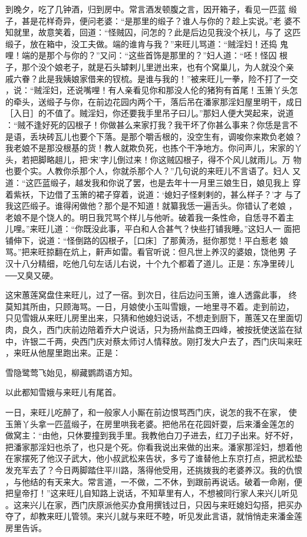到晚夕，吃了几钟酒，归到房中。常言酒发顿腹之言，因开箱子，看见一匹蓝
缎子，甚是花样奇异，便问老婆：“是那里的缎子？谁人与你的？趁上实说。”老
婆不知就里，故意笑着，回道：“怪贼囚，问怎的？此是后边见我没个袄儿，与了
这匹缎子，放在箱中，没工夫做。端的谁肯与我？”来旺儿骂道：“贼淫妇！还捣
鬼哩！端的是那个与你的？”又问：“这些首饰是那里的？”妇人道：“呸！怪囚
根子，那个没个娘老子，就是石头罅剌儿里迸出来，也有个窝巢儿，为人就没个亲
戚六眷？此是我姨娘家借来的钗梳。是谁与我的！”被来旺儿一拳，险不打了一交
，说：“贼淫妇，还说嘴哩！有人亲看见你和那没人伦的猪狗有首尾！玉箫丫头怎
的牵头，送缎子与你，在前边花园内两个干，落后吊在潘家那淫妇屋里明干，成日
［入日］的不值了。贼淫妇，你还要我手里吊子曰儿。”那妇人便大哭起来，说道
：“贼不逢好死的囚根子！你做甚么来家打我？我干坏了你甚么事来？你恁是言不
是语，丢块砖瓦儿也要个下落。是那个嚼舌根的，没空生有，调唆你来欺负老娘？
我老娘不是那没根基的货！教人就欺负死，也拣个干净地方。你问声儿，宋家的丫
头，若把脚略趄儿，把‘宋’字儿倒过来！你这贼囚根子，得不个风儿就雨儿。万
物也要个实。人教你杀那个人，你就杀那个人？”几句说的来旺儿不言语了。妇人
又道：“这匹蓝缎子，越发我和你说了罢，也是去年十一月里三娘生日，娘见我上
穿着紫袄，下边借了玉箫的裙子穿着，说道：‘媳妇子怪剌剌的，甚么样子？’才
与了我这匹缎子。谁得闲做他？那个是不知道！就纂我恁一遍舌头。你错认了老娘
，老娘不是个饶人的。明日我咒骂个样儿与他听。破着我一条性命，自恁寻不着主
儿哩。”来旺儿道：“你既没此事，平白和人合甚气？快些打铺我睡。”这妇人一
面把铺伸下，说道：“怪倒路的囚根子，［口床］了那黄汤，挺你那觉！平白惹老
娘骂。”把来旺掠翻在炕上，鼾声如雷。看官听说：但凡世上养汉的婆娘，饶他男
子汉十八分精细，吃他几句左话儿右说，十个九个都着了道儿。正是：东净里砖儿
──又臭又硬。

这宋蕙莲窝盘住来旺儿，过了一宿。到次日，往后边问玉箫，谁人透露此事，
终莫知其所由，只顾海骂。一日，月娘使小玉叫雪娥，一地里寻不着。走到前边，
只见雪娥从来旺儿房里出来，只猜和他媳妇说话，不想走到厨下，蕙莲又在里面切
肉，良久，西门庆前边陪着乔大户说话，只为扬州盐商王四峰，被按抚使送监在狱
中，许银二千两，央西门庆对蔡太师讨人情释放。刚打发大户去了，西门庆叫来旺
，来旺从他屋里跑出来。正是：

雪隐鹭莺飞始见，柳藏鹦鹉语方知。

以此都知雪娥与来旺儿有尾首。

一日，来旺儿吃醉了，和一般家人小厮在前边恨骂西门庆，说怎的我不在家，
使玉箫丫头拿一匹蓝缎子，在房里哄我老婆。把他吊在花园奸耍，后来潘金莲怎的
做窝主：“由他，只休要撞到我手里。我教他白刀子进去，红刀子出来。好不好，
把潘家那淫妇也杀了，也只是个死。你看我说出来做的出来。潘家那淫妇，想着他
在家摆死了他汉子武大，他小叔武松来告状，多亏了谁替他上东京打点，把武松垫
发充军去了？今日两脚踏住平川路，落得他受用，还挑拨我的老婆养汉。我的仇恨
，与他结的有天来大。常言道，一不做，二不休，到跟前再说话。破着一命剐，便
把皇帝打！”这来旺儿自知路上说话，不知草里有人，不想被同行家人来兴儿听见
。这来兴儿在家，西门庆原派他买办食用撰钱过日，只因与来旺媳妇勾搭，把买办
夺了，却教来旺儿管领。来兴儿就与来旺不睦，听见发此言语，就悄悄走来潘金莲
房里告诉。

